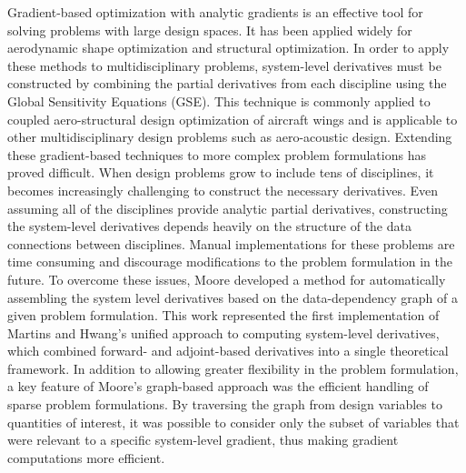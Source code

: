 \documentclass[]{aiaa-tc} %
\begin{document}
    Gradient-based optimization with analytic gradients is an effective tool for solving problems
    with large design spaces. It has been applied widely for aerodynamic shape optimization \cite{Liou2010,palacios2012adjoint}
    and structural optimization\cite{Kennedy:2013:TACS, Venkataraman:2004:SOC, Adelman:1986:structure-sensitivity}.
    In order to apply these methods to multidisciplinary problems, system-level derivatives must be
    constructed by combining the partial derivatives from each discipline using the Global Sensitivity
    Equations\cite{Sobieski1990} (GSE). This technique is commonly applied to coupled
    aero-structural design optimization of aircraft wings\cite{Kenway2012c, Haghighat2012} and is applicable to
    other multidisciplinary design problems such as aero-acoustic design\cite{economon2012coupled}. Extending these
    gradient-based techniques to more complex problem formulations has proved difficult. When
    design problems grow to include tens of disciplines, it becomes increasingly challenging to construct the
    necessary derivatives. Even assuming all of the disciplines provide analytic partial derivatives,
    constructing the system-level derivatives depends heavily on the structure of the data connections
    between disciplines. Manual implementations for these problems are time consuming and discourage modifications
    to the problem formulation in the future. To overcome these issues, Moore developed a method for automatically assembling the system
    level derivatives based on the data-dependency graph of a given problem formulation\cite{openmdao_derivatives}. This
    work represented the first implementation of Martins and Hwang's unified approach to computing system-level derivatives,
    which combined forward- and adjoint-based derivatives into a single theoretical framework\cite{martins2013}. 
    In addition to allowing greater flexibility in the problem formulation, a key feature of Moore's graph-based approach was the efficient
    handling of sparse problem formulations. By traversing the graph from design variables to quantities of interest,
    it was possible to consider only the subset of variables that were relevant to a specific system-level gradient, thus
    making gradient computations more efficient.
\end{document}

